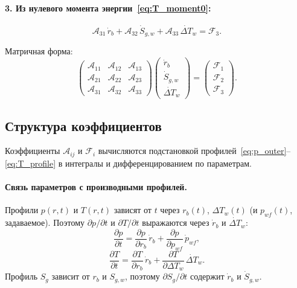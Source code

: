 \documentclass[12pt,a4paper]{article}
\newcommand{\pp}{\partial}
\begin{document}
\paragraph{3. Из нулевого момента энергии~\eqref{eq:T_moment0}:}
\begin{equation}\label{eq:ode3}
  \mathcal{A}_{31}\,\dot{r}_b
  + \mathcal{A}_{32}\,\dot{S}_{g,w}
  + \mathcal{A}_{33}\,\dot{\Delta T}_w
  = \mathcal{F}_3.
\end{equation}

Матричная форма:
\begin{equation}\label{eq:ode_system}
  \boxed{
    \begin{pmatrix}
      \mathcal{A}_{11} & \mathcal{A}_{12} & \mathcal{A}_{13} \\
      \mathcal{A}_{21} & \mathcal{A}_{22} & \mathcal{A}_{23} \\
      \mathcal{A}_{31} & \mathcal{A}_{32} & \mathcal{A}_{33}
    \end{pmatrix}
    \begin{pmatrix}
      \dot{r}_b \\ \dot{S}_{g,w} \\ \dot{\Delta T}_w
    \end{pmatrix}
    =
    \begin{pmatrix}
      \mathcal{F}_1 \\ \mathcal{F}_2 \\ \mathcal{F}_3
    \end{pmatrix}.
  }
\end{equation}

\subsection{Структура коэффициентов}

Коэффициенты $\mathcal{A}_{ij}$ и $\mathcal{F}_i$ вычисляются
подстановкой профилей~\eqref{eq:p_outer}--\eqref{eq:T_profile}
в интегралы и дифференцированием по параметрам.

\paragraph{Связь параметров с производными профилей.}
Профили $p(r,t)$ и $T(r,t)$ зависят от $t$ через
$r_b(t)$, $\Delta T_w(t)$ (и $p_{wf}(t)$, задаваемое).
Поэтому $\pp p/\pp t$ и $\pp T/\pp t$ выражаются
через $\dot{r}_b$ и $\dot{\Delta T}_w$:
\begin{equation}\label{eq:dp_dt}
  \frac{\pp p}{\pp t}
  = \frac{\pp p}{\pp r_b}\,\dot{r}_b
    + \frac{\pp p}{\pp p_{wf}}\,\dot{p}_{wf},
\end{equation}
\begin{equation}\label{eq:dT_dt}
  \frac{\pp T}{\pp t}
  = \frac{\pp T}{\pp r_b}\,\dot{r}_b
    + \frac{\pp T}{\pp \Delta T_w}\,\dot{\Delta T}_w.
\end{equation}
Профиль $S_g$ зависит от $r_b$ и $S_{g,w}$, поэтому
$\pp S_g/\pp t$ содержит $\dot{r}_b$ и $\dot{S}_{g,w}$.
\end{document}
